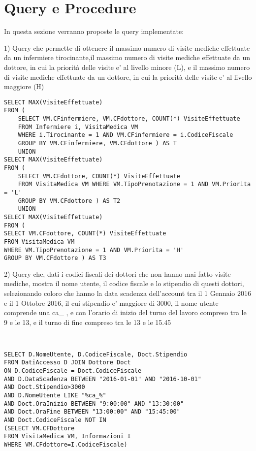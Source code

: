 \documentclass{report}
\begin{document}
\section*{Query e Procedure}
In questa sezione verranno proposte le query implementate:

1) Query che permette di ottenere il massimo numero di visite mediche effettuate da un infermiere tirocinante,il massimo numero di visite mediche effettuate da un dottore, in cui la priorità delle visite e’ al livello minore (L), e il massimo numero di visite mediche effettuate da un dottore, in cui la priorità delle visite e’ al livello maggiore (H) 
\begin{verbatim}
SELECT MAX(VisiteEffettuate)
FROM (
	SELECT VM.CFinfermiere, VM.CFdottore, COUNT(*) VisiteEffettuate 
	FROM Infermiere i, VisitaMedica VM 
	WHERE i.Tirocinante = 1 AND VM.CFinfermiere = i.CodiceFiscale 
	GROUP BY VM.CFinfermiere, VM.CFdottore ) AS T 
	UNION 
SELECT MAX(VisiteEffettuate) 
FROM (
	SELECT VM.CFdottore, COUNT(*) VisiteEffettuate 
	FROM VisitaMedica VM WHERE VM.TipoPrenotazione = 1 AND VM.Priorita = 'L'
	GROUP BY VM.CFdottore ) AS T2 
	UNION 
SELECT MAX(VisiteEffettuate) 
FROM (
SELECT VM.CFdottore, COUNT(*) VisiteEffettuate 
FROM VisitaMedica VM 
WHERE VM.TipoPrenotazione = 1 AND VM.Priorita = 'H' 
GROUP BY VM.CFdottore ) AS T3
\end{verbatim}


2) Query che, dati i codici fiscali dei dottori che non hanno mai fatto visite mediche, 
mostra il nome utente, il codice fiscale e lo stipendio di questi dottori, 
selezionando coloro che hanno la data scadenza dell’account tra il 1 Gennaio 2016 
e il 1 Ottobre 2016, il cui stipendio e’ maggiore di 3000, il nome utente comprende
una ca\_ , e con l’orario di inizio del turno del lavoro compreso tra le 
9 e le 13, e il turno di fine compreso tra le 13 e le 15.45 

\begin{verbatim}


SELECT D.NomeUtente, D.CodiceFiscale, Doct.Stipendio
FROM DatiAccesso D JOIN Dottore Doct
ON D.CodiceFiscale = Doct.CodiceFiscale 
AND D.DataScadenza BETWEEN "2016-01-01" AND "2016-10-01"
AND Doct.Stipendio>3000 
AND D.NomeUtente LIKE "%ca_%" 
AND Doct.OraInizio BETWEEN "9:00:00" AND "13:30:00"
AND Doct.OraFine BETWEEN "13:00:00" AND "15:45:00" 
AND Doct.CodiceFiscale NOT IN 
(SELECT VM.CFDottore 
FROM VisitaMedica VM, Informazioni I 
WHERE VM.CFdottore=I.CodiceFiscale)

\end{verbatim}
\end{document}
